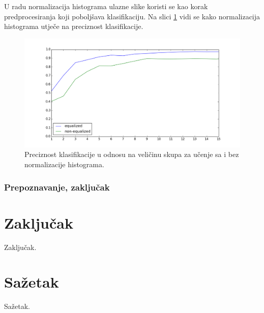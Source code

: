 \documentclass[times, utf8, seminar, numeric]{fer}
\begin{document}
U radu \citep{conf/isda/ChandrappaR12} normalizacija histograma ulazne slike koristi se kao korak predprocesiranja koji poboljšava klasifikaciju. Na slici \ref{fig:eq_noneq_comp} vidi se kako normalizacija histograma utječe na preciznost klasifikacije.

\begin{figure}[!htb]
\centering
\includegraphics[width=\textwidth]{raw/eq_noneq_comp.png}
\caption{Preciznost klasifikacije u odnosu na veličinu skupa za učenje sa i bez normalizacije histograma.}
\label{fig:eq_noneq_comp}
\end{figure}

\subsection{Prepoznavanje, zaključak}

\chapter{Zaključak}
Zaključak.




\chapter{Sažetak}
Sažetak.
\end{document}
